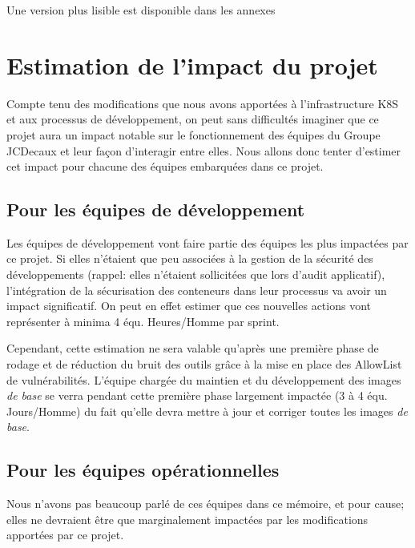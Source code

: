 \begin{center}
    \colorbox{gray!15}{Une version plus lisible est disponible dans les annexes}
\end{center}

\newpage

\section{Estimation de l'impact du projet}
Compte tenu des modifications que nous avons apportées à l'infrastructure \ac{K8S} et aux processus de développement,
on peut sans difficultés imaginer que ce projet aura un impact notable sur le fonctionnement des équipes du Groupe 
JCDecaux et leur façon d'interagir entre elles.
\newline Nous allons donc tenter d'estimer cet impact pour chacune des équipes embarquées dans ce projet.

\subsection{Pour les équipes de développement}
Les équipes de développement vont faire partie des équipes les plus impactées par ce \linebreak projet.
Si elles n'étaient que peu associées à la gestion de la sécurité des développements (rappel: elles n'étaient sollicitées que
lors d'audit applicatif), l'intégration de la sécurisation des conteneurs dans leur processus va avoir un impact 
significatif.
\newline On peut en effet estimer que ces nouvelles actions vont représenter à minima 4 équ. Heures/Homme par sprint.

Cependant, cette estimation ne sera valable qu'après une première phase de rodage et de réduction du bruit des outils
grâce à la mise en place des AllowList de vulnérabilités.
\newline L'équipe chargée du maintien et du développement des images \emph{de base} se verra pendant cette première phase 
largement impactée (3 à 4 équ. Jours/Homme) du fait qu'elle devra mettre à jour et corriger toutes les images 
\emph{de base}. 

\subsection{Pour les équipes opérationnelles}
Nous n'avons pas beaucoup parlé de ces équipes dans ce mémoire, et pour cause; elles ne devraient être que marginalement 
impactées par les modifications apportées par ce projet.

